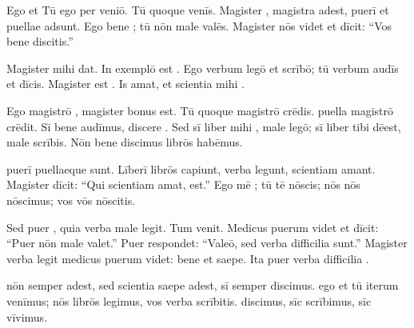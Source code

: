 \documentclass[12pt]{nextbook}
\begin{document}
\begin{readersection}{Ego et Tū}
 ego per  veniō. Tū quoque venīs. Magister , magistra adest, puerī et puellae adsunt. Ego bene ; tū nōn male valēs. Magister nōs videt et dīcit: “Vos bene discitis.”

Magister mihi  dat. In exemplō est . Ego verbum legō et scrībō; tū verbum audīs et dīcis. Magister est . Is  amat, et scientia mihi .

Ego magistrō ,  magister bonus est. Tū quoque magistrō crēdis.  puella magistrō crēdit. Sī bene audīmus, discere . Sed sī liber mihi , male legō; sī liber tibi dēest, male scrībis. Nōn bene discimus  librōs habēmus.

 puerī puellaeque sunt. Līberī librōs capiunt, verba legunt, scientiam amant. Magister dīcit: “Qui scientiam amat,  est.” Ego mē ; tū tē nōscis; nōs nōs nōscimus; vos vōs nōscitis.

Sed puer , quia verba male legit. Tum  venit. Medicus puerum videt et dīcit: “Puer nōn male valet.” Puer respondet: “Valeō, sed verba difficilia sunt.” Magister verba legit  medicus puerum videt: bene et saepe. Ita puer verba difficilia .

 nōn semper adest, sed scientia saepe adest, sī semper discimus.  ego et tū iterum venīmus; nōs librōs legimus, vos verba scrībitis.  discimus, sīc scrībimus, sīc vīvimus.

\end{readersection}
\end{document}
